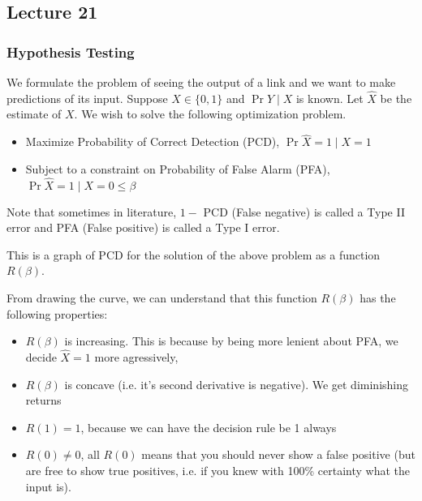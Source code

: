 \subsection{Lecture 21}
\subsubsection{Hypothesis Testing}
We formulate the problem of seeing the output of a link and we want to make predictions of its input.
Suppose $X \in \{0, 1\}$ and $\Pr{Y \mid X}$ is known. Let $\hat{X}$ be the estimate of $X$. We wish to solve the following optimization problem.

\begin{itemize}
    \item Maximize Probability of Correct Detection (PCD), $\Pr{\hat{X} = 1 \mid X = 1}$
    \item Subject to a constraint on Probability of False Alarm (PFA), $\Pr{\hat{X} = 1 \mid X = 0} \leq \beta$
\end{itemize}

Note that sometimes in literature, $1 -$ PCD (False negative) is called a Type II error and PFA (False positive) is called a Type I error.

\begin{definition}
    This is a graph of PCD for the solution of the above problem as a function $R(\beta)$.
\end{definition}

From drawing the curve, we can understand that this function $R(\beta)$ has the following properties:
\begin{itemize}
    \item $R(\beta)$ is increasing. This is because by being more lenient about PFA,
    we decide $\hat{X} = 1$ more agressively,
    \item $R(\beta)$ is concave (i.e. it's second derivative is negative). We get diminishing returns
    \item  $R(1) = 1$, because we can have the decision rule be 1 always
    \item $R(0) \neq 0$, all $R(0)$ means that you should never show a false positive
    (but are free to show true positives, i.e. if you knew with 100\% certainty what the input is).
\end{itemize}

